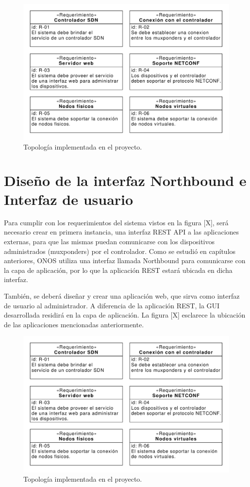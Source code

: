   \begin{figure}[H]
    \centering
    \includegraphics[scale=0.65]{Figures/req_sys.pdf}
    \caption{Topología implementada en el proyecto.}
    \label{fig:req_sys}
  \end{figure}

  \section{Diseño de la interfaz Northbound e Interfaz de usuario}
  Para cumplir con los requerimientos del sistema vistos en la figura [X], será necesario crear en primera instancia, una interfaz REST API a las aplicaciones externas, para que las mismas puedan comunicarse con los dispositivos administrados (muxponders) por el controlador. Como se estudió en capítulos anteriores, ONOS utiliza una interfaz llamada Northbound para comunicarse con la capa de aplicación, por lo que la aplicación REST estará ubicada en dicha interfaz. 

  También, se deberá diseñar y crear una aplicación web, que sirva como interfaz de usuario al administrador. A diferencia de la aplicación REST, la GUI desarrollada residirá en la capa de aplicación. La figura [X] esclarece la ubicación de las aplicaciones mencionadas anteriormente. 

  \begin{figure}[H]
    \centering
    \includegraphics[scale=0.65]{Figures/req_sys.pdf}
    \caption{Topología implementada en el proyecto.}
    \label{fig:req_sys}
  \end{figure}

